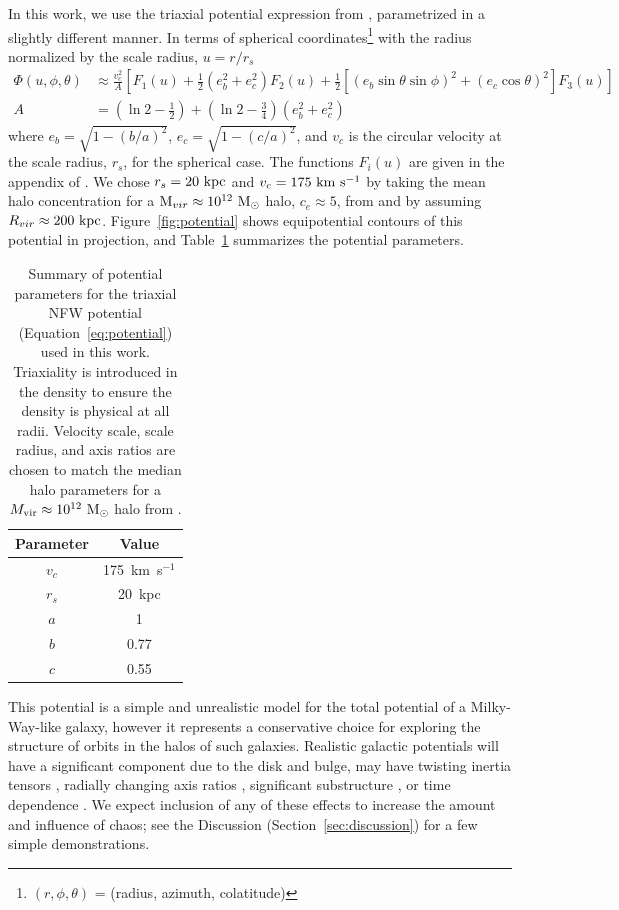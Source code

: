 \documentclass[letterpaper,12pt,preprint]{aastex}
\newcommand{\msun}{\ensuremath{\mathrm{M}_\odot}}
\begin{document}
In this work, we use the triaxial potential expression from \citet{leesuto03}, parametrized in a slightly different manner. In terms of spherical coordinates\footnote{$(r,\phi,\theta)$ = (radius, azimuth, colatitude)} with the radius normalized by the scale radius, $u = r/r_s$
\begin{align}
	\Phi(u,\phi,\theta) &\approx \frac{v_c^2}{A}\left[F_1(u) + \frac{1}{2}(e_b^2 + e_c^2)F_2(u) + \frac{1}{2} [(e_b\sin\theta \sin\phi)^2 + (e_c\cos\theta)^2] F_3(u) \right]\label{eq:potential}\\
	A &= \left(\ln2 - \frac{1}{2}\right) + \left(\ln2-\frac{3}{4}\right) (e_b^2 + e_c^2)
\end{align}
where $e_b = \sqrt{1 - (b/a)^2}$, $e_c = \sqrt{1 - (c/a)^2}$, and $v_c$ is the circular velocity at the scale radius, $r_s$, for the spherical case. The functions $F_i(u)$ are given in the appendix of \cite{leesuto03}. We chose $r_s=20~{\rm kpc}$ and $v_c = 175~{\rm km}~{\rm s}^{-1}$ by taking the mean halo concentration for a ${\rm M}_{vir} \approx 10^{12}~\msun$ halo, $c_e\approx5$, from \cite{jing02} and by assuming $R_{vir}\approx200~{\rm kpc}$. Figure~\ref{fig:potential} shows equipotential contours of this potential in projection, and Table~\ref{tbl:potential} summarizes the potential parameters.

\begin{table}[ht]
\begin{center}
	\begin{tabular}{ c  c }
	         Parameter & Value\\\toprule
		$v_c$ & 175~km~s$^{-1}$\\
		$r_s$ & 20~kpc\\
		$a$ & 1\\
		$b$ & 0.77\\
		$c$ & 0.55\\
		\bottomrule
		\end{tabular}
	\caption{Summary of potential parameters for the triaxial NFW potential (Equation~\ref{eq:potential}) used in this work. Triaxiality is introduced in the density to ensure the density is physical at all radii. Velocity scale, scale radius, and axis ratios are chosen to match the median halo parameters for a $M_{\rm vir} \approx 10^{12}~\msun$ halo from \citep{jing02}. \label{tbl:potential}}
\end{center}
\end{table}

This potential is a simple and unrealistic model for the total potential of a Milky-Way-like galaxy, however it represents a conservative choice for exploring the structure of orbits in the halos of such galaxies. Realistic galactic potentials will have a significant component due to the disk and bulge, may have twisting inertia tensors \citep{romanowsky98}, radially changing axis ratios \citep[e.g.,][]{kazantzidis04,debattista08,veraciro11,butsky15}, significant substructure \citep{moore98,zemp09}, or time dependence \citep[either from bulk rotation, mass growth, mergers, etc.; see, e.g.,][]{bailin05}. We expect inclusion of any of these effects to increase the amount and influence of chaos; see the Discussion (Section~\ref{sec:discussion}) for a few simple demonstrations. 
\end{document}
